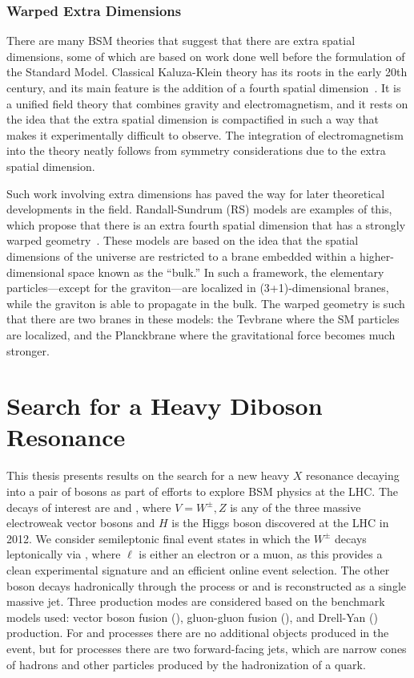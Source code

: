 \subsubsection{Warped Extra Dimensions}

There are many BSM theories that suggest that there are extra spatial dimensions, some of which are based on work done well before the formulation of the Standard Model.
Classical Kaluza-Klein theory has its roots in the early 20th century, and its main feature is the addition of a fourth spatial dimension~\cite{1921spaw966K}.
It is a unified field theory that combines gravity and electromagnetism, and it rests on the idea that the extra spatial dimension is compactified in such a way that makes it experimentally difficult to observe.
The integration of electromagnetism into the theory neatly follows from symmetry considerations due to the extra spatial dimension.

Such work involving extra dimensions has paved the way for later theoretical developments in the field.
Randall-Sundrum (RS) models are examples of this, which propose that there is an extra fourth spatial dimension that has a strongly warped geometry~\cite{PhysRevLett.83.4690}.
These models are based on the idea that the spatial dimensions of the universe are restricted to a brane embedded within a higher-dimensional space known as the ``bulk.''
In such a framework, the elementary particles---except for the graviton---are localized in (3+1)-dimensional branes, while the graviton is able to propagate in the bulk.
The warped geometry is such that there are two branes in these models: the Tevbrane where the SM particles are localized, and the Planckbrane where the gravitational force becomes much stronger.

\section{Search for a Heavy Diboson Resonance}
\label{sec:search}

This thesis presents results on the search for a new heavy $X$ resonance decaying into a pair of bosons as part of efforts to explore BSM physics at the LHC.
The decays of interest are \XtoWV and \XtoWH, where $V=W^\pm,Z$ is any of the three massive electroweak vector bosons and $H$ is the Higgs boson discovered at the LHC in 2012.
We consider semileptonic final event states in which the $W^\pm$ decays leptonically via \Wtolnu, where $\ell$ is either an electron or a muon, as this provides a clean experimental signature and an efficient online event selection.
The other \VorH boson decays hadronically through the process \Vtoqqbarpr or \Htobbbar and is reconstructed as a single massive jet.
Three production modes are considered based on the benchmark models used: vector boson fusion (\VBF), gluon-gluon fusion (\ggF), and Drell-Yan (\DY) production.
For \ggF and \DY processes there are no additional objects produced in the event, but for \VBF processes there are two forward-facing jets, which are narrow cones of hadrons and other particles produced by the hadronization of a quark.

